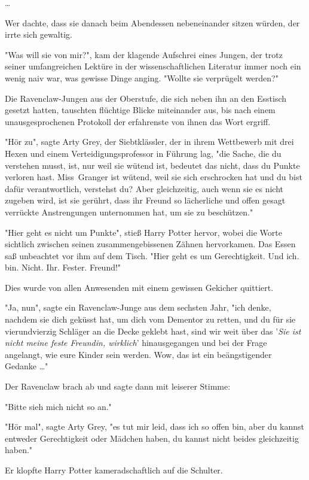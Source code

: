 {…

Wer dachte, dass sie danach beim Abendessen nebeneinander sitzen würden, der irrte sich gewaltig.

"Was will sie von mir?", kam der klagende Aufschrei eines Jungen, der trotz seiner umfangreichen Lektüre in der wissenschaftlichen Literatur immer noch ein wenig naiv war, was gewisse Dinge anging. "Wollte sie verprügelt werden?"

Die Ravenclaw-Jungen aus der Oberstufe, die sich neben ihn an den Esstisch gesetzt hatten, tauschten flüchtige Blicke miteinander aus, bis nach einem unausgesprochenen Protokoll der erfahrenste von ihnen das Wort ergriff.

"Hör zu", sagte Arty Grey, der Siebtklässler, der in ihrem Wettbewerb mit drei Hexen und einem Verteidigungsprofessor in Führung lag, "die Sache, die du verstehen musst, ist, nur weil sie wütend ist, bedeutet das nicht, dass du Punkte verloren hast. Miss~Granger ist wütend, weil sie sich erschrocken hat und du bist dafür verantwortlich, verstehst du? Aber gleichzeitig, auch wenn sie es nicht zugeben wird, ist sie gerührt, dass ihr Freund so lächerliche und offen gesagt verrückte Anstrengungen unternommen hat, um sie zu beschützen."

"Hier geht es nicht um Punkte", stieß Harry Potter hervor, wobei die Worte sichtlich zwischen seinen zusammengebissenen Zähnen hervorkamen. Das Essen saß unbeachtet vor ihm auf dem Tisch. "Hier geht es um Gerechtigkeit. Und ich. bin. Nicht. Ihr. Fester. Freund!"

Dies wurde von allen Anwesenden mit einem gewissen Gekicher quittiert.

"Ja, nun", sagte ein Ravenclaw-Junge aus dem sechsten Jahr, "ich denke, nachdem sie dich geküsst hat, um dich vom Dementor zu retten, und du für sie vierundvierzig Schläger an die Decke geklebt hast, sind wir weit über das '\emph{Sie ist nicht meine feste Freundin, wirklich}' hinausgegangen und bei der Frage angelangt, wie eure Kinder sein werden. Wow, das ist ein beängstigender Gedanke …"

Der Ravenclaw brach ab und sagte dann mit leiserer Stimme:

"Bitte sieh mich nicht so an."

"Hör mal", sagte Arty Grey, "es tut mir leid, dass ich so offen bin, aber du kannst entweder Gerechtigkeit oder Mädchen haben, du kannst nicht beides gleichzeitig haben."

Er klopfte Harry Potter kameradschaftlich auf die Schulter.

}
